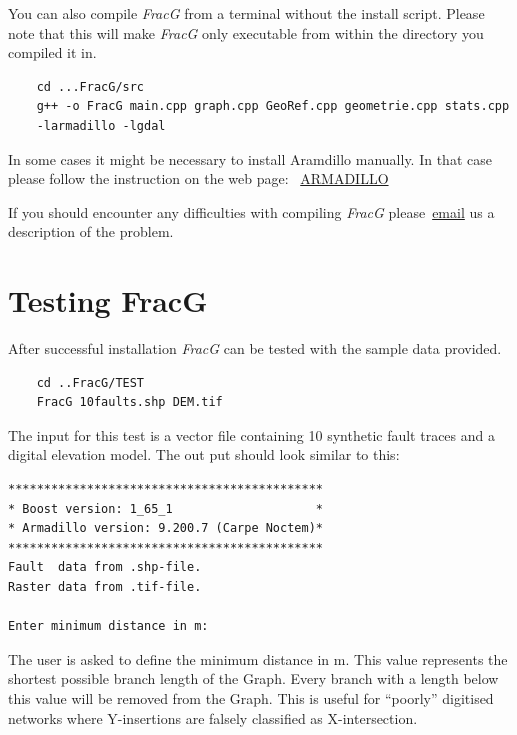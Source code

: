 \documentclass[10pt,a4paper]{article}
\begin{document}
You can also compile \textit{FracG} from a terminal without the install script. Please note that this will make \textit{FracG} only executable from within the directory you compiled it in.

\begin{verbatim}
	cd ...FracG/src
	g++ -o FracG main.cpp graph.cpp GeoRef.cpp geometrie.cpp stats.cpp 
	-larmadillo -lgdal
\end{verbatim}

In some cases it might be necessary to install Aramdillo manually. In that case please follow the instruction on the web page:
~\href{http://arma.sourceforge.net/download.html}{ARMADILLO}

If you should encounter any difficulties with compiling \textit{FracG} please~\href{mailto:uli.kelka@csiro.au}{email} us a description of the problem.
\newpage
\section{Testing FracG}
After successful  installation \textit{FracG} can be tested with the sample data provided.
\begin{verbatim}
	cd ..FracG/TEST
	FracG 10faults.shp DEM.tif
\end{verbatim}
The input for this test is a vector file containing 10 synthetic fault traces and a digital elevation model. The out put should look similar to this:
\begin{small}
\begin{verbatim}
******************************************** 
* Boost version: 1_65_1                    *
* Armadillo version: 9.200.7 (Carpe Noctem)*
******************************************** 
Fault  data from .shp-file.
Raster data from .tif-file.

Enter minimum distance in m: 
\end{verbatim}
\end{small}
The user is asked to define the minimum distance in m. This value represents the shortest possible branch length of the Graph. Every branch with a length below this value will be removed from the Graph. This is useful for ``poorly'' digitised networks where Y-insertions are falsely classified as X-intersection.
\end{document}

